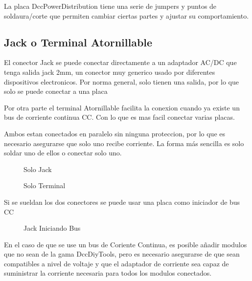 

La placa DccPowerDistribution tiene una serie de jumpers y puntos de soldaura/corte
que permiten cambiar ciertas partes y ajustar su comportamiento.

\subsection{Jack o Terminal Atornillable}

El conector Jack se puede conectar directamente a un adaptador AC/DC que tenga salida 
jack 2mm, un conector muy generico usado por diferentes dispositivos electronicos.
Por norma general, solo tienen una salida, por lo que solo se puede conectar a una placa

Por otra parte el terminal Atornillable facilita la conexion cuando ya existe un bus de
corriente continua CC. Con lo que es mas facil conectar varias placas.

Ambos estan conectados en paralelo sin ninguna proteccion, por lo que es necesario
asegurarse que solo uno recibe corriente. La forma más sencilla es solo soldar uno 
de ellos o conectar solo uno.

\begin{figure}[H]
    \centering
    \begin{minipage}{0.25\textwidth}
        \centering
        
        \caption{Solo Jack}
        \label{fig:VccConnectionJack}
    \end{minipage}
    \hfill
    \begin{minipage}{0.7\textwidth}
        \centering
        
        \caption{Solo Terminal}
        \label{fig:VccConnectionTerminal}
    \end{minipage}
\end{figure}

Si se sueldan los dos conectores se puede usar una placa como iniciador de bus CC

\begin{figure}[H]
    \centering
    
    \caption{Jack Iniciando Bus}
    \label{fig:VccConnectionJackBus}
\end{figure}

En el caso de que se use un bus de Coriente Continua, es posible añadir modulos que no sean
de la gama DccDiyTools, pero es necesario asegurarse de que sean compatibles a nivel de voltaje
y que el adaptador de corriente sea capaz de suministrar la corriente necesaria para todos los
modulos conectados.


